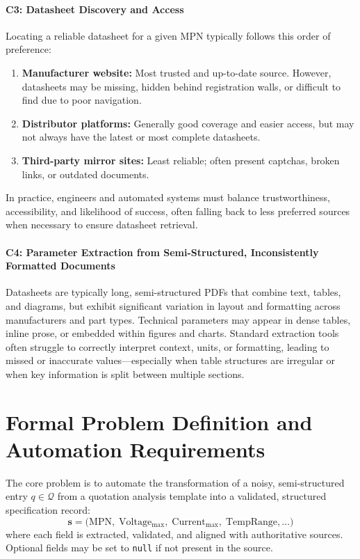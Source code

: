 \paragraph{C3: Datasheet Discovery and Access}
Locating a reliable datasheet for a given MPN typically follows this order of preference:
\begin{enumerate}
    \item \textbf{Manufacturer website:} Most trusted and up-to-date source. However, datasheets may be missing, hidden behind registration walls, or difficult to find due to poor navigation.
    \item \textbf{Distributor platforms:} Generally good coverage and easier access, but may not always have the latest or most complete datasheets.
    \item \textbf{Third-party mirror sites:} Least reliable; often present captchas, broken links, or outdated documents.
\end{enumerate}
In practice, engineers and automated systems must balance trustworthiness, accessibility, and likelihood of success, often falling back to less preferred sources when necessary to ensure datasheet retrieval.

\paragraph{C4: Parameter Extraction from Semi-Structured, Inconsistently Formatted Documents}
Datasheets are typically long, semi-structured PDFs that combine text, tables, and diagrams, but exhibit significant variation in layout and formatting across manufacturers and part types.
Technical parameters may appear in dense tables, inline prose, or embedded within figures and charts.
Standard extraction tools often struggle to correctly interpret context, units, or formatting, leading to missed or inaccurate values—especially when table structures are irregular or when key information is split between multiple sections.

\section{Formal Problem Definition and Automation Requirements}

The core problem is to automate the transformation of a noisy, semi-structured entry $q \in \mathcal{Q}$ from a quotation analysis template into a validated, structured specification record:
\[
\mathbf{s} = \bigl(\mathrm{MPN},\; \mathrm{Voltage_{max}},\; \mathrm{Current_{max}},\; \mathrm{TempRange}, \ldots\bigr)
\]
where each field is extracted, validated, and aligned with authoritative sources. Optional fields may be set to \texttt{null} if not present in the source.

